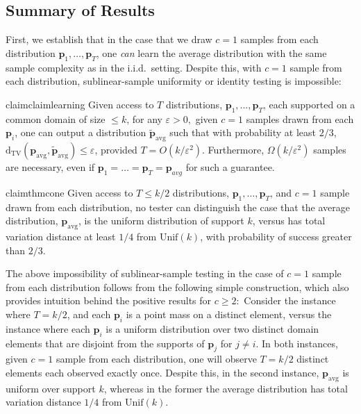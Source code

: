 \documentclass[10pt]{article} %
\def\eps{{\varepsilon}}
\theoremstyle{plain}
\newcommand{\bp}{\textbf{p}}
\newcommand{\unik}{\mathrm{Unif}(k)}%
\newcommand{\dtv}{\mathrm{d_{TV}}}
\newcommand{\avg}{\mathrm{avg}}
\begin{document}
\newcommand{\poi}{\mathrm{Poi}}
\newcommand{\uni}{\textbf{u}}
\newcommand{\bv}{\textbf{v}}

\subsection{Summary of Results}
\label{sec:results}

\allowdisplaybreaks

First, we establish that in the case that we draw $c=1$ samples  from each distribution $\bp_1,\ldots,\bp_T$, one \emph{can} learn the average distribution with the same sample complexity as in the i.i.d.\ setting.  Despite this, with $c=1$ sample from each distribution, sublinear-sample uniformity or identity testing is impossible:

\begin{restatable}{claim}{claimlearning}
	\label{claim:learning}
	Given access to $T$ distributions, $\bp_1,\ldots,\bp_T$, each supported on a common domain of size $\le k$, for any $\eps>0,$ given $c=1$ samples drawn from each $\bp_i$, one can output a distribution $\tilde{\bp}_{\avg}$ such that with probability at least $2/3$, $\dtv(\bp_{\avg}, \tilde{\bp}_{\avg}) \le \eps$, provided $T=O(k/\eps^2)$.
	Furthermore, $\Omega(k/\eps^2)$ samples are necessary, even if $\bp_1=\ldots =\bp_T = \bp_{avg}$ for such a guarantee.
\end{restatable}

\begin{restatable}[Impossibility result with $c=1$, proof in \Cref{sec:impossibility_cone_proof}]{claim}{thmcone}
	\label{thm:cone}
	Given access to $T\le k/2$ distributions, $\bp_1,\ldots,\bp_T$, and $c = 1$ sample drawn from each distribution, no tester can distinguish the case that the average distribution, $\bp_{\avg}$, is the uniform distribution of support $k$, versus has total variation distance at least $1/4$ from $\unik$, with probability of success greater than $2/3.$ 
\end{restatable}

The above impossibility of sublinear-sample testing in the case of $c=1$ sample from each distribution follows from the following simple construction, which also provides intuition behind the positive results for $c\ge 2:$  Consider the instance where $T=k/2$, and each $\bp_i$ is a point mass on a distinct element, versus the instance where each $\bp_i$ is a uniform distribution over two distinct domain elements that are disjoint from the supports of $\bp_j$ for $j \neq i$.  In both instances, given $c=1$ sample from each distribution, one will observe $T=k/2$ distinct elements each observed exactly once.  Despite this, in the second instance, $\bp_{\avg}$ is uniform over support $k$, whereas in the former the average distribution has total variation distance $1/4$ from $\unik.$
\end{document}
